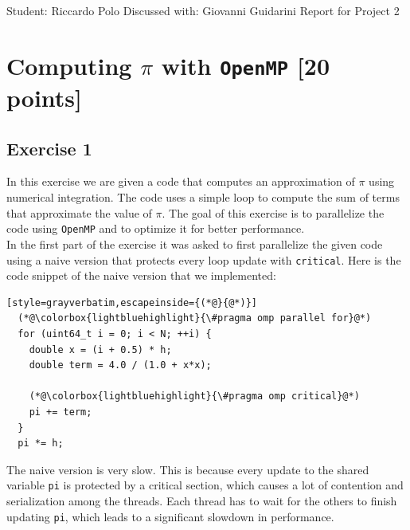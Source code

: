 \documentclass[unicode,10pt,a4paper,oneside,numbers=endperiod,openany]{scrartcl}
\begin{document}
\setassignment
{}

            {Student: Riccardo Polo}
            {Discussed with: Giovanni Guidarini}
            {Report for Project 2}{}
\newline

\assignmentpolicy

\newpage
\section{Computing $\pi$ with \texttt{OpenMP} [20 points]}
\subsection{Exercise 1}
In this exercise we are given a code that computes an approximation of $\pi$ using numerical integration. The code uses a simple loop to compute the sum of terms that approximate the value of $\pi$. The goal of this exercise is to parallelize the code using \texttt{OpenMP} and to optimize it for better performance.\\

In the first part of the exercise it was asked to first parallelize the given code using a naive version that protects every loop update with \texttt{critical}. Here is the code snippet of the naive version that we implemented:
\begin{lstlisting}[style=grayverbatim,escapeinside={(*@}{@*)}]
  (*@\colorbox{lightbluehighlight}{\#pragma omp parallel for}@*)
  for (uint64_t i = 0; i < N; ++i) {
    double x = (i + 0.5) * h;
    double term = 4.0 / (1.0 + x*x);

    (*@\colorbox{lightbluehighlight}{\#pragma omp critical}@*)
    pi += term;
  }
  pi *= h;
  \end{lstlisting}
The naive version is very slow. This is because every update to the shared variable \texttt{pi} is protected by a critical section, which causes a lot of contention and serialization among the threads. Each thread has to wait for the others to finish updating \texttt{pi}, which leads to a significant slowdown in performance.\\
\end{document}
